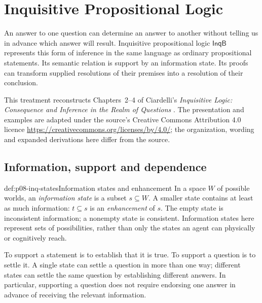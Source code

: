 \chapter{Inquisitive Propositional Logic}
\label{sec:p08-inquisitive-propositional}

An answer to one question can determine an answer to another without telling
us in advance which answer will result. Inquisitive propositional logic
\(\mathsf{InqB}\) represents this form of inference in the same language as
ordinary propositional statements. Its semantic relation is support by an
information state. Its proofs can transform supplied resolutions of their
premises into a resolution of their conclusion.

This treatment reconstructs Chapters~2--4 of Ciardelli's
\emph{Inquisitive Logic: Consequence and Inference in the Realm of Questions}
\cite{Ciardelli2023InquisitivePropositional}. The presentation and examples
are adapted under the source's Creative Commons Attribution 4.0 licence
\url{https://creativecommons.org/licenses/by/4.0/}; the organization,
wording and expanded derivations here differ from the source.

\section{Information, support and dependence}

\begin{hbdefinition}{def:p08-inq-states}{Information states and enhancement}
In a space \(W\) of possible worlds, an \emph{information state} is a subset
\(s\subseteq W\). A smaller state contains at least as much information:
\(t\subseteq s\) is an \emph{enhancement} of \(s\). The empty state is
inconsistent information; a nonempty state is consistent. Information states
here represent sets of possibilities, rather than only the states an agent
can physically or cognitively reach.
\end{hbdefinition}

To support a statement is to establish that it is true. To support a question
is to settle it. A single state can settle a question in more than one way;
different states can settle the same question by establishing different
answers. In particular, supporting a question does not require endorsing
one answer in advance of receiving the relevant information.

